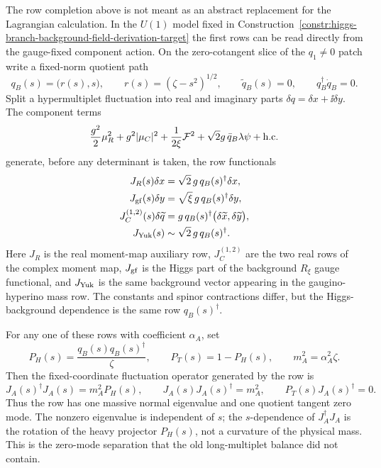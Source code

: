 \begin{example}
\label{ex:higgs-branch-rank-one-row-jacobians}
The row completion above is not meant as an abstract replacement for the
Lagrangian calculation.  In the \(U(1)\) model fixed in
Construction~\ref{constr:higgs-branch-background-field-derivation-target} the
first rows can be read directly from the gauge-fixed component action.  On the
zero-cotangent slice of the \(q_1\ne0\) patch write a fixed-norm quotient path
\[
  q_B(s)=\bigl(r(s),s\bigr),\qquad
  r(s)=(\zeta-s^2)^{1/2},\qquad
  \widetilde q_B(s)=0,
  \qquad
  q_B^\dagger\dot q_B=0 .
\]
Split a hypermultiplet fluctuation into real and imaginary parts
\(\delta q=\delta x+\ii\delta y\).  The component terms
\[
  \frac{g^2}{2}\mu_R^2
  +g^2|\mu_C|^2
  +\frac1{2\xi}{\mathcal F}^2
  +\sqrt2 g\,\bar q_B\lambda\psi+\hbox{h.c.}
\]
generate, before any determinant is taken, the row functionals
\begin{equation}
\begin{aligned}
  J_R(s)\delta x
  &=\sqrt2\,g\,q_B(s)^\dagger\delta x,\\
  J_{\rm gf}(s)\delta y
  &=\sqrt\xi\,g\,q_B(s)^\dagger\delta y,\\
  J_C^{(1,2)}(s)\delta\widetilde q
  &=g\,q_B(s)^\dagger
    \bigl(\delta\widetilde x,\delta\widetilde y\bigr),\\
  J_{\rm Yuk}(s)
  &\sim \sqrt2\,g\,q_B(s)^\dagger .
  \label{eq:higgs-branch-rank-one-row-jacobians}
\end{aligned}
\end{equation}
Here \(J_R\) is the real moment-map auxiliary row, \(J_C^{(1,2)}\) are the two
real rows of the complex moment map, \(J_{\rm gf}\) is the Higgs part of the
background \(R_\xi\) gauge functional, and \(J_{\rm Yuk}\) is the same
background vector appearing in the gaugino-hyperino mass row.  The constants
and spinor contractions differ, but the Higgs-background dependence is the
same row \(q_B(s)^\dagger\).

For any one of these rows with coefficient \(\alpha_A\), set
\[
  P_H(s)=\frac{q_B(s)q_B(s)^\dagger}{\zeta},
  \qquad
  P_T(s)=1-P_H(s),
  \qquad
  m_A^2=\alpha_A^2\zeta .
\]
Then the fixed-coordinate fluctuation operator generated by the row is
\begin{equation}
  J_A(s)^\dagger J_A(s)=m_A^2P_H(s),
  \qquad
  J_A(s)J_A(s)^\dagger=m_A^2,
  \qquad
  P_T(s)J_A(s)^\dagger=0 .
  \label{eq:higgs-branch-row-projector-mass}
\end{equation}
Thus the row has one massive normal eigenvalue and one quotient tangent zero
mode.  The nonzero eigenvalue is independent of \(s\); the \(s\)-dependence of
\(J_A^\dagger J_A\) is the rotation of the heavy projector \(P_H(s)\), not a
curvature of the physical mass.  This is the zero-mode separation that the old
long-multiplet balance did not contain.


\end{example}
